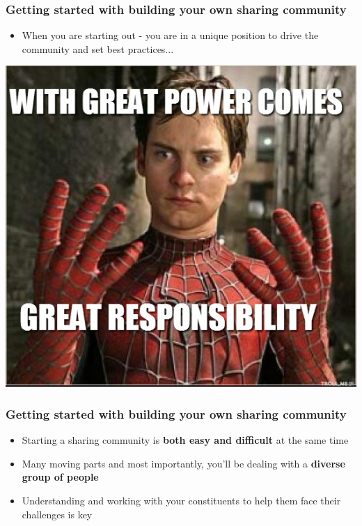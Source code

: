 \begin{frame}
	\frametitle{Getting started with building your own sharing community}
	\begin{itemize}
		\item When you are starting out - you are in a unique position to drive the community and set best practices...
	\end{itemize}
	\centering\includegraphics[scale=0.3]{../images/power-responsibility.png}
\end{frame}

\begin{frame}
	\frametitle{Getting started with building your own sharing community}
	\begin{itemize}
		\item Starting a sharing community is {\bf both easy and difficult} at the same time
		\item Many moving parts and most importantly, you'll be dealing with a {\bf diverse group of people}
		\item Understanding and working with your constituents to help them face their challenges is key
	\end{itemize}
\end{frame}

